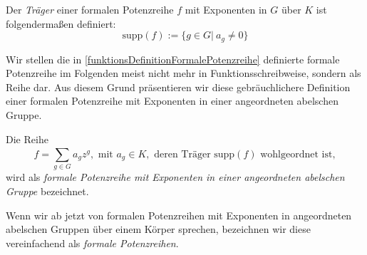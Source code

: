 

\begin{defn}\label{TraegerFormalePotenzreihe}
Der \textit{Träger} einer formalen Potenzreihe $f$ mit Exponenten in $G$ über $K$ ist folgendermaßen definiert: 
\[ \text{supp}(f) := \lbrace g \in G \vert ~ a_g \neq 0\rbrace\]
\end{defn}
%
%
%
Wir stellen die in \ref{funktionsDefinitionFormalePotenzreihe} definierte formale Potenzreihe im Folgenden meist nicht mehr in Funktionsschreibweise, sondern als Reihe dar. Aus diesem Grund präsentieren wir diese gebräuchlichere Definition einer formalen Potenzreihe mit Exponenten in einer angeordneten abelschen Gruppe.
\begin{defn}
Die Reihe 
\[f = \sum_{g \in G}^{}a_g z^g, \text{ mit } a_g \in K, \text{ deren Träger supp}(f) \text{ wohlgeordnet ist}, \]
wird als \textit{formale Potenzreihe mit Exponenten in einer angeordneten abelschen Gruppe} bezeichnet.
\end{defn}
%
%
% 
%
%
%
\begin{nota}
Wenn wir ab jetzt von formalen Potenzreihen mit Exponenten in angeordneten abelschen Gruppen über einem Körper sprechen, bezeichnen wir diese vereinfachend als \textit{formale Potenzreihen}.
\end{nota}
%
%
%
%
%
%
%
